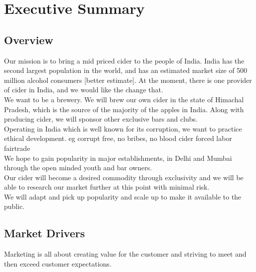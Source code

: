 \documentclass[11pt]{article}
\begin{document}
\newpage
\tableofcontents

\newpage
\section{Executive Summary}
  \subsection{Overview}

Our mission is to bring a mid priced cider to the people of India. India has the second largest population in the world, and has an estimated market size of 500 million alcohol consumers [better estimate]. At the moment, there is one provider of cider in India, and we would like the change that. \\

We want to be a brewery. We will brew our own cider in the state of Himachal Pradesh, which is the source of the majority of the apples in India. Along with producing cider, we will sponsor other exclusive bars and clubs. \\

Operating in India which is well known for its corruption, we want to practice ethical development. eg corrupt free, no bribes, no blood cider forced labor fairtrade \\

We hope to gain popularity in major establishments, in Delhi and Mumbai through the open minded youth and bar owners. \\

Our cider will become a desired commodity through exclusivity and we will be able to research our market further at this point with minimal risk. \\

We will adapt and pick up popularity and scale up to make it available to the public.

  \subsection{Market Drivers}
Marketing is all about creating value for the customer and striving to meet and then exceed customer expectations.\\
\end{document}
